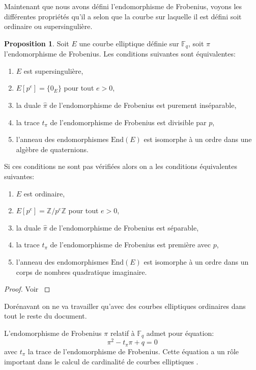 \documentclass[10pt,a4paper]{book}
\theoremstyle{plain}
\theoremstyle{definition}
\theoremstyle{definition}
\theoremstyle{definition}
\theoremstyle{definition}
\newtheorem{prop}[thm]{Proposition}
\theoremstyle{definition}
\theoremstyle{remark}
\theoremstyle{remark}
\theoremstyle{definition}
\begin{document}
Maintenant que nous avons défini l'endomorphisme de Frobenius, voyons les 
différentes propriétés qu'il a selon que la courbe sur laquelle il est défini 
soit ordinaire ou supersingulière.

\begin{prop}
\label{pro:fro:dis}
Soit $E$ une courbe elliptique définie sur $\mathbb{F}_q$, soit $\pi$ l'endomorphisme de Frobenius. Les conditions suivantes sont équivalentes:
\begin{enumerate}
\item $E$ est supersingulière,
\item $E[p^e]=\{0_E\}$ pour tout $e > 0$,
\item la duale $\widehat{\pi}$ de l'endomorphisme de Frobenius est purement inséparable,
\item la trace $t_{\pi}$ de l'endomorphisme de Frobenius est divisible par $p$,
\item l'anneau des endomorphismes $\mathrm{End}(E)$ est isomorphe à un ordre dans une algèbre de quaternions.
\end{enumerate}
Si ces conditions ne sont pas vérifiées alors on a les conditions équivalentes suivantes:
\begin{enumerate}
\item $E$ est ordinaire,
\item $E[p^e]=\mathbb{Z}/p^e\mathbb{Z}$ pour tout $e > 0$,
\item la duale $\widehat{\pi}$ de l'endomorphisme de Frobenius est séparable,
\item la trace $t_{\pi}$ de l'endomorphisme de Frobenius est première avec $p$,
\item l'anneau des endomorphismes $\mathrm{End}(E)$ est isomorphe à un ordre dans un corps de nombres quadratique imaginaire.
\end{enumerate}
\end{prop}

\begin{proof}
Voir \cite[Theorem V.3.1]{Silv1}
\end{proof}

Dorénavant on ne va travailler qu'avec des courbes elliptiques ordinaires dans 
tout le reste du document.

L'endomorphisme de Frobenius $\pi$ relatif à $\mathbb{F}_q$ admet pour équation:
\begin{equation*}
\pi^2-t_{\pi}\pi+q=0
\end{equation*}
avec $t_{\pi}$ la trace de l'endomorphisme de Frobenius. Cette équation a un rôle important dans le calcul de cardinalité de courbes elliptiques \cite{Schoof85}.
\end{document}
